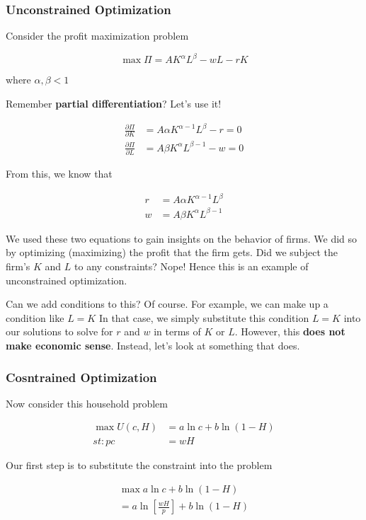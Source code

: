 \documentclass[11pt]{scrartcl}
\begin{document}
\subsubsection{Unconstrained Optimization}

Consider the profit maximization problem

\[ \max \Pi =AK^{\alpha }L^{\beta }-wL-rK \]

where $\alpha ,\beta <1$

Remember \textbf{partial differentiation}? Let's use it!

\begin{align*}
\frac{\partial \Pi }{\partial K} &= A\alpha K^{\alpha -1}L^{\beta }-r=0 \\
\frac{\partial \Pi }{\partial L} &= A\beta K^{\alpha }L^{\beta -1}-w=0
\end{align*}

From this, we know that

\begin{align*}
r &= A\alpha K^{\alpha -1}L^{\beta } \\
w &= A\beta K^{\alpha }L^{\beta -1}
\end{align*}

We used these two equations to gain insights on the behavior of firms. We did so by optimizing (maximizing) the profit that the firm gets. Did we subject the firm's $K$ and $L$ to any constraints? Nope! Hence this is an example of unconstrained optimization.

Can we add conditions to this? Of course. For example, we can make up a condition like $L = K$ In that case, we simply substitute this condition $L=K$ into our solutions to solve for $r$ and $w$ in terms of $K$ or $L$. However, this \textbf{does not make economic sense}. Instead, let's look at something that does.

\subsubsection{Cosntrained Optimization}

Now consider this household problem

\begin{align*}
\max U\left( c,H\right)  &= a\ln c+b\ln \left( 1-H\right)  \\
st : pc &= wH
\end{align*}

Our first step is to substitute the constraint into the problem

\begin{align*}
\max a\ln c+b\ln \left( 1-H\right) \\
=a\ln \left[ \frac{wH}{p}\right] +b\ln (1-H)
\end{align*}
\end{document}
